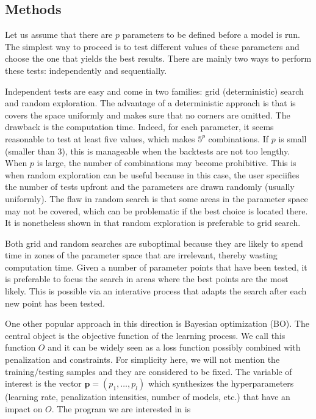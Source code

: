 \documentclass[]{krantz}
\theoremstyle{definition}
\theoremstyle{definition}
\theoremstyle{definition}
\theoremstyle{remark}
\begin{document}
\hypertarget{methods}{%
\subsection{Methods}\label{methods}}

Let us assume that there are \(p\) parameters to be defined before a
model is run. The simplest way to proceed is to test different values of
these parameters and choose the one that yields the best results. There
are mainly two ways to perform these tests: independently and
sequentially.

Independent tests are easy and come in two families: grid
(deterministic) search and random exploration. The advantage of a
deterministic approach is that is covers the space uniformly and makes
sure that no corners are omitted. The drawback is the computation time.
Indeed, for each parameter, it seems reasonable to test at least five
values, which makes \(5^p\) combinations. If \(p\) is small (smaller
than 3), this is manageable when the backtests are not too lengthy. When
\(p\) is large, the number of combinations may become prohibitive. This
is when random exploration can be useful because in this case, the user
speciifies the number of tests upfront and the parameters are drawn
randomly (usually uniformly). The flaw in random search is that some
areas in the parameter space may not be covered, which can be
problematic if the best choice is located there. It is nonetheless shown
in \citet{bergstra2012random} that random exploration is preferable to
grid search.

Both grid and random searches are suboptimal because they are likely to
spend time in zones of the parameter space that are irrelevant, thereby
wasting computation time. Given a number of parameter points that have
been tested, it is preferable to focus the search in areas where the
best points are the most likely. This is possible via an interative
process that adapts the search after each new point has been tested.

One other popular approach in this direction is Bayesian optimization
(BO). The central object is the objective function of the learning
process. We call this function \(O\) and it can be widely seen as a loss
function possibly combined with penalization and constraints. For
simplicity here, we will not mention the training/testing samples and
they are considered to be fixed. The variable of interest is the vector
\(\textbf{p}=(p_1,\dots,p_l)\) which synthesizes the hyperparameters
(learning rate, penalization intensities, number of models, etc.) that
have an impact on \(O\). The program we are interested in is
\end{document}
